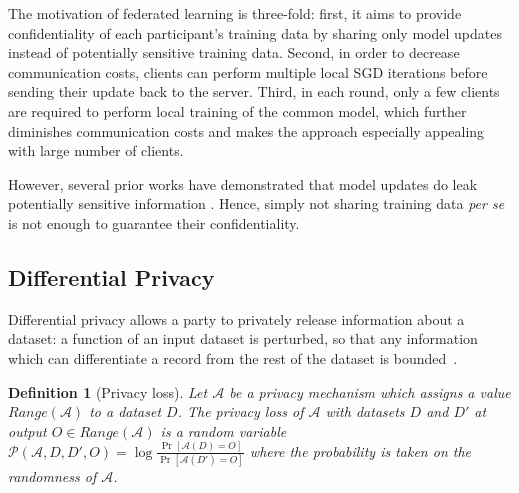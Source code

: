\documentclass[accepted]{uai2021} %
\newtheorem{definition}{Definition}
\begin{document}
The motivation of federated learning is three-fold: first, it aims to provide confidentiality of each participant's training data by sharing only model updates instead of potentially sensitive training data. Second, in order to decrease communication costs, clients can perform multiple local SGD iterations before sending their update back to the server. 
Third, in each round, only a few clients are required to perform local training of the common model, which further diminishes communication costs  and makes the approach especially appealing with large number of clients. 


However, several prior works have demonstrated that model updates do leak potentially sensitive information \citep{NasrSH19,Property_inference}. Hence, simply not sharing training data \emph{per se} is not enough to guarantee their confidentiality.



\subsection{Differential Privacy}
\label{sec:DP}
Differential privacy allows a party to privately release information about a dataset:  a function of an input dataset is perturbed, so that any information which can differentiate a record from the rest of the dataset is bounded~\cite{Dwork2014book}.

 \begin{definition}[Privacy loss]
 Let $\mathcal{A}$ be a privacy mechanism which assigns a value $\mathit{Range}(\mathcal{A})$ to a dataset $D$. The privacy loss of $\mathcal{A}$ with datasets $D$ and $D'$ at output $O \in \mathit{Range}(\mathcal{A})$ is a random variable $\mathcal{P}(\mathcal{A},D,D',O) = \log\frac{\Pr[\mathcal{A}(D) = O]}{\Pr[\mathcal{A}(D') = O]}$ 
 where the probability is taken on the randomness of $\mathcal{A}$.%
 \label{def:ploss}
 \end{definition}
\end{document}
